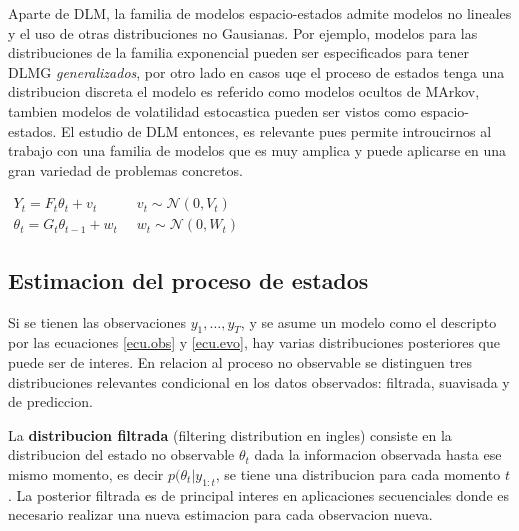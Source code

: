 \documentclass[12pt]{article}\usepackage[]{graphicx}\usepackage[]{color}
\begin{document}
Aparte de DLM, la familia de modelos espacio-estados admite modelos no lineales y el uso de otras distribuciones no Gausianas. Por ejemplo, modelos para las distribuciones de la familia exponencial pueden ser especificados para tener DLMG \textit{generalizados}, por otro lado en casos uqe el proceso de estados tenga una distribucion discreta el modelo es referido como modelos ocultos de MArkov, tambien modelos de volatilidad estocastica pueden ser vistos como espacio-estados. El estudio de DLM entonces, es relevante pues permite introucirnos al trabajo con una familia de modelos que es muy amplica y puede aplicarse en una gran variedad de problemas concretos. 


\begin{center}
$\begin{array}{lc}
Y_t=F_t\theta_t + v_t  &  v_t \sim \mathcal{N}(0,V_t) \\
\theta_t = G_t \theta_{t-1} + w_t \;\; & w_t \sim \mathcal{N}(0,W_t)
\end{array}$
\end{center}

\subsection{Estimacion del proceso de estados}

Si se tienen las observaciones $y_1,\dots,y_T$, y se asume un modelo como el descripto por las ecuaciones \eqref{ecu.obs} y \eqref{ecu.evo}, hay varias distribuciones posteriores que puede ser de interes. En relacion al proceso no observable se distinguen tres distribuciones relevantes condicional en los datos observados: filtrada, suavisada y de prediccion.

La \textbf{distribucion filtrada} (filtering distribution en ingles) consiste en la distribucion del estado no observable $\theta_t$ dada la informacion observada hasta ese mismo momento, es decir $p(\theta_t | y_{1:t}$, se tiene una distribucion para cada momento $t$. La posterior filtrada es de principal interes en aplicaciones secuenciales donde es necesario realizar una nueva estimacion para cada observacion nueva. 
\end{document}
